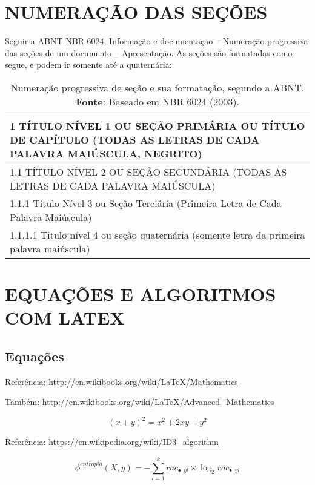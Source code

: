 \section{NUMERAÇÃO DAS SEÇÕES}\label{sec:NUMERAÇÃO}
Seguir a ABNT NBR 6024, Informação e documentação – Numeração progressiva das seções de um documento – Apresentação. As seções são formatadas como segue, e podem ir somente até a quaternária:

\begin{table}
	\caption{Numeração progressiva de seção e sua formatação, segundo a ABNT. \textbf{Fonte}: Baseado em NBR 6024 (2003).}
	\label{tab:numeracaosecao}
	\begin{tabular}{|p{14.7cm}|} 
		\hline
		\textbf{\large 1 TÍTULO NÍVEL 1 OU SEÇÃO PRIMÁRIA OU TÍTULO DE CAPÍTULO (TODAS AS LETRAS DE CADA PALAVRA MAIÚSCULA, NEGRITO)}  \\ 
		\hline
		1.1 TÍTULO NÍVEL 2 OU SEÇÃO SECUNDÁRIA (TODAS AS LETRAS DE CADA PALAVRA MAIÚSCULA)~ ~                                   \\ 
		\hline
		1.1.1 Titulo Nível 3 ou Seção Terciária (Primeira Letra de Cada Palavra Maiúscula)~ ~                                   \\ 
		\hline
		1.1.1.1 Titulo nível 4 ou seção quaternária (somente letra da primeira palavra maiúscula)~ ~ ~ ~ ~ ~ ~~                 \\
		\hline
	\end{tabular}
\end{table}

\section{EQUAÇÕES E ALGORITMOS COM LATEX}\label{sec:LATEX}

\subsection{Equações}\label{sec:Equacoes}
Referência: \url{http://en.wikibooks.org/wiki/LaTeX/Mathematics}

Também: \url{http://en.wikibooks.org/wiki/LaTeX/Advanced_Mathematics}

\begin{equation}
(x + y)^2 = x^2 + 2xy + y^2
\label{eq:Teorema1}
\end{equation}

Referência: \url{https://en.wikipedia.org/wiki/ID3_algorithm}

\begin{equation} \label{eq:DT3} 
\phi^{entropia}(X, y) = -\sum_{l=1}^{k} rac_{\bullet, yl} \times \log_{2} rac_{\bullet, yl}
\end{equation}

